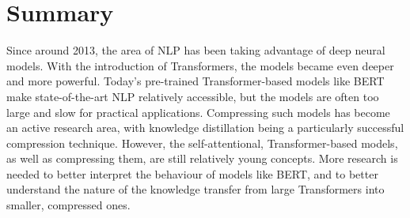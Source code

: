\documentclass[bsc,frontabs,singlespacing,parskip,deptreport]{infthesis}
\begin{document}
{{    %
  }

  \section{Summary}{
    Since around 2013, the area of NLP has been taking advantage of deep neural models.
    With the introduction of Transformers, the models became even deeper and more powerful.
    Today's pre-trained Transformer-based models like BERT make state-of-the-art NLP relatively accessible, but the models are often too large and slow for practical applications.
    Compressing such models has become an active research area, with knowledge distillation being a particularly successful compression technique.
    However, the self-attentional, Transformer-based models, as well as compressing them, are still relatively young concepts.
    More research is needed to better interpret the behaviour of models like BERT, and to better understand the nature of the knowledge transfer from large Transformers into smaller, compressed ones.
  }
}
\end{document}
